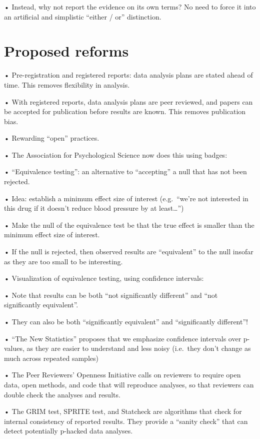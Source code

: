 \documentclass[
  letterpaper,
  DIV=11,
  numbers=noendperiod]{scrreprt}
\begin{document}
• Instead, why not report the evidence on its own terms? No need to
force it into an artificial and simplistic ``either / or'' distinction.

\hypertarget{proposed-reforms}{%
\section{Proposed reforms}\label{proposed-reforms}}

• Pre-registration and registered reports: data analysis plans are
stated ahead of time. This removes flexibility in analysis.

• With registered reports, data analysis plans are peer reviewed, and
papers can be accepted for publication before results are known. This
removes publication bias.

• Rewarding ``open'' practices.

• The Association for Psychological Science now does this using badges:

• ``Equivalence testing'': an alternative to ``accepting'' a null that
has not been rejected.

• Idea: establish a minimum effect size of interest (e.g.~``we're not
interested in this drug if it doesn't reduce blood pressure by at
least\ldots{}'')

• Make the null of the equivalence test be that the true effect is
smaller than the minimum effect size of interest.

• If the null is rejected, then observed results are ``equivalent'' to
the null insofar as they are too small to be interesting.

• Visualization of equivalence testing, using confidence intervals:

• Note that results can be both ``not significantly different'' and
``not significantly equivalent''.

• They can also be both ``significantly equivalent'' and ``significantly
different''!

• ``The New Statistics'' proposes that we emphasize confidence intervals
over p-values, as they are easier to understand and less noisy
(i.e.~they don't change as much across repeated samples)

• The Peer Reviewers' Openness Initiative calls on reviewers to require
open data, open methods, and code that will reproduce analyses, so that
reviewers can double check the analyses and results.

• The GRIM test, SPRITE test, and Statcheck are algorithms that check
for internal consistency of reported results. They provide a ``sanity
check'' that can detect potentially p-hacked data analyses.
\end{document}
